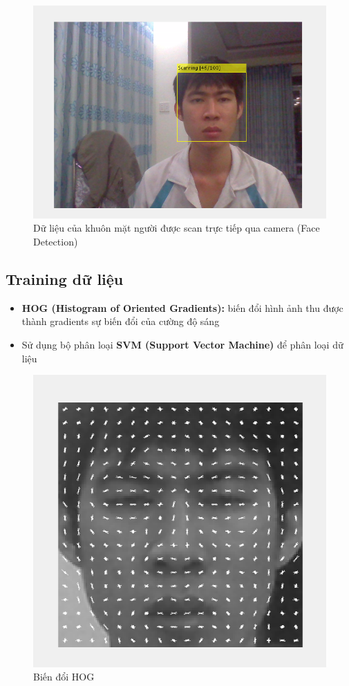 \documentclass[a4paper]{article}
\begin{document}
\begin{figure} [H]
\centering
\includegraphics[scale=0.45]{scan_face.png}
\caption{Dữ liệu của khuôn mặt người được scan trực tiếp qua camera (Face Detection) }
\label{fig:ts}
\end{figure}

\subsection{Training dữ liệu}
\begin{itemize}
    \item \textbf{HOG (Histogram of Oriented Gradients):} biến đổi hình ảnh thu được thành gradients sự biến đổi của cường độ sáng 
    \item Sử dụng bộ phân loại \textbf{SVM (Support Vector Machine)} để phân loại dữ liệu
\end{itemize}

\begin{figure} [H]
\centering
\includegraphics[scale=0.45]{HOG_extraction.png}
\caption{ Biến đổi HOG }
\label{fig:ts}
\end{figure}
\end{document}
